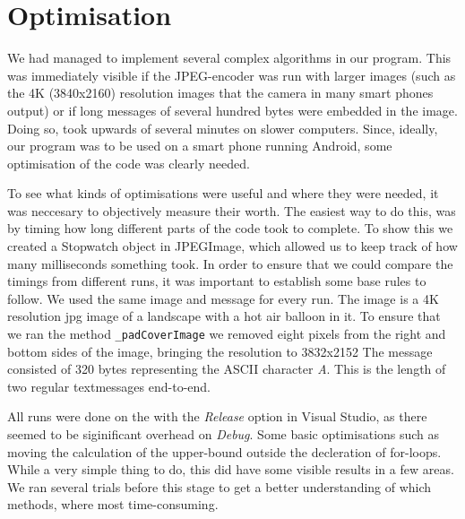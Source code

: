 \section{Optimisation}
We had managed to implement several complex algorithms in our program. 
This was immediately visible if the JPEG-encoder was run with larger images (such as the 4K (3840x2160) resolution images that the camera in many smart phones output) or if long messages of several hundred bytes were embedded in the image.
Doing so, took upwards of several minutes on slower computers.
Since, ideally, our program was to be used on a smart phone running Android, some optimisation of the code was clearly needed.

To see what kinds of optimisations were useful and where they were needed, it was neccesary to objectively measure their worth.
The easiest way to do this, was by timing how long different parts of the code took to complete.
To show this we created a Stopwatch object in JPEGImage, which allowed us to keep track of how many milliseconds something took.
In order to ensure that we could compare the timings from different runs, it was important to establish some base rules to follow.
We used the same image and message for every run. 
The image is a 4K resolution jpg image of a landscape with a hot air balloon in it. 
To ensure that we ran the method \lstinline|_padCoverImage| we removed eight pixels from the right and bottom sides of the image, bringing the resolution to 3832x2152
The message consisted of 320 bytes representing the ASCII character \textit{A}. 
This is the length of two regular textmessages end-to-end.

All runs were done on the with the \textit{Release} option in Visual Studio, as there seemed to be siginificant overhead on \textit{Debug}.
Some basic optimisations such as moving the calculation of the upper-bound outside the decleration of for-loops.
While a very simple thing to do, this did have some visible results in a few areas.
We ran several trials before this stage to get a better understanding of which methods, where most time-consuming.

